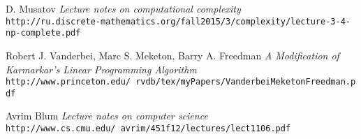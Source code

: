 \documentclass{article}
\begin{document}
\begin{thebibliography}{9}
D. Musatov
\textit{Lecture notes on computational complexity}
\\\texttt{http://ru.discrete-mathematics.org/fall2015/3/complexity/lecture-3-4-np-complete.pdf}
 
Robert J. Vanderbei, Marc S. Meketon, Barry A. Freedman
\textit{A Modification of Karmarkar's Linear Programming Algorithm}
\\\texttt{http://www.princeton.edu/~rvdb/tex/myPapers/VanderbeiMeketonFreedman.pdf}

Avrim Blum
\textit{Lecture notes on computer science}
\\\texttt{http://www.cs.cmu.edu/~avrim/451f12/lectures/lect1106.pdf}
\end{thebibliography}
\end{document}
